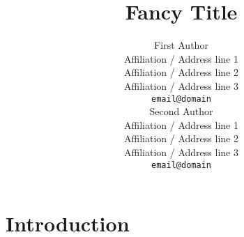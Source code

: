 \documentclass[11pt]{article}
\title{Fancy Title}
\author{First Author \\
  Affiliation / Address line 1 \\
  Affiliation / Address line 2 \\
  Affiliation / Address line 3 \\
  {\tt email@domain} \\\And
  Second Author \\
  Affiliation / Address line 1 \\
  Affiliation / Address line 2 \\
  Affiliation / Address line 3 \\
  {\tt email@domain} \\}
\date{}
\begin{document}
\maketitle
\begin{abstract}
\end{abstract}


\section{Introduction}
\label{intro}





\end{document}
